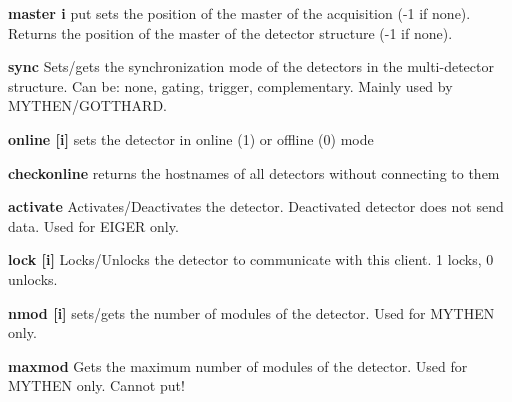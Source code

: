 \begin{DoxyItemize}
\item {\bfseries master i} {\ttfamily put} sets the position of the master of the acquisition (-\/1 if none). Returns the position of the master of the detector structure (-\/1 if none).
\end{DoxyItemize}


\begin{DoxyItemize}
\item {\bfseries sync} Sets/gets the synchronization mode of the detectors in the multi-\/detector structure. Can be: {\ttfamily none}, {\ttfamily gating}, {\ttfamily trigger}, {\ttfamily complementary}. Mainly used by MYTHEN/GOTTHARD.
\end{DoxyItemize}


\begin{DoxyItemize}
\item {\bfseries online \mbox{[}i\mbox{]}} sets the detector in online (1) or offline (0) mode
\end{DoxyItemize}


\begin{DoxyItemize}
\item {\bfseries checkonline} returns the hostnames of all detectors without connecting to them
\end{DoxyItemize}


\begin{DoxyItemize}
\item {\bfseries activate} Activates/Deactivates the detector. Deactivated detector does not send data. Used for EIGER only.
\end{DoxyItemize}


\begin{DoxyItemize}
\item {\bfseries lock \mbox{[}i\mbox{]}} Locks/Unlocks the detector to communicate with this client. 1 locks, 0 unlocks.
\end{DoxyItemize}


\begin{DoxyItemize}
\item {\bfseries nmod \mbox{[}i\mbox{]}} sets/gets the number of modules of the detector. Used for MYTHEN only.
\end{DoxyItemize}


\begin{DoxyItemize}
\item {\bfseries maxmod } Gets the maximum number of modules of the detector. Used for MYTHEN only. Cannot put!
\end{DoxyItemize}


